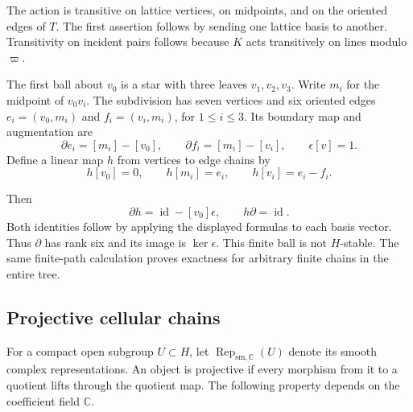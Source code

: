 The action is transitive on lattice vertices, on midpoints, and on the oriented edges of $T$.
The first assertion follows by sending one lattice basis to another.
Transitivity on incident pairs follows because $K$ acts transitively on lines modulo $\varpi$.

\begin{example}[The first ball when $q=2$]\label{v4-arith:ic:w10-d:fixed-center:ex:star}
The first ball about $v_0$ is a star with three leaves $v_1,v_2,v_3$.
Write $m_i$ for the midpoint of $v_0v_i$.
The subdivision has seven vertices and six oriented edges
$e_i=(v_0,m_i)$ and $f_i=(v_i,m_i)$, for $1\le i\le3$.
Its boundary map and augmentation are
\[
 \partial e_i=[m_i]-[v_0],\qquad
 \partial f_i=[m_i]-[v_i],\qquad
 \epsilon[v]=1.
\]
Define a linear map $h$ from vertices to edge chains by
\[
 h[v_0]=0,\qquad h[m_i]=e_i,\qquad h[v_i]=e_i-f_i.
\]

Then
\[
 \partial h=\operatorname{id}-[v_0]\epsilon,\qquad h\partial=\operatorname{id}.
\]
Both identities follow by applying the displayed formulas to each basis vector.
Thus $\partial$ has rank six and its image is $\ker\epsilon$.
This finite ball is not $H$-stable.
The same finite-path calculation proves exactness for arbitrary finite chains in the entire tree.
\end{example}

\subsection{Projective cellular chains}

For a compact open subgroup $U\subset H$, let $\operatorname{Rep}_{\mathrm{sm},\mathbb C}(U)$ denote its smooth complex representations.
An object is projective if every morphism from it to a quotient lifts through the quotient map.
The following property depends on the coefficient field $\mathbb C$.

